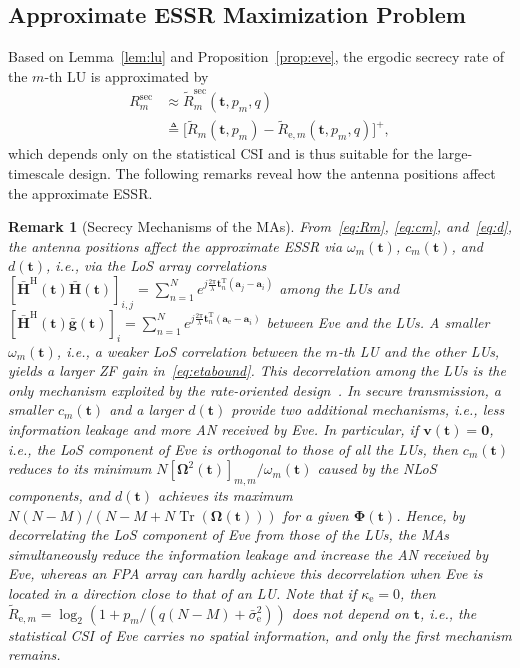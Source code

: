 \documentclass[journal]{IEEEtran}
\newtheorem{remark}{Remark}
\newcommand{\tr}{\operatorname{Tr}}
\newcommand{\bt}{\mathbf{t}}
\newcommand{\gb}{\bar{\mathbf{g}}}
\newcommand{\Hb}{\bar{\mathbf{H}}}
\newcommand{\bv}{\mathbf{v}}
\newcommand{\ba}{\mathbf{a}}
\newcommand{\bOm}{\boldsymbol{\Omega}}
\newcommand{\bPhi}{\boldsymbol{\Phi}}
\newcommand{\sbe}{\bar{\sigma}_{\mathrm{e}}^2}
\begin{document}
\subsection{Approximate ESSR Maximization Problem}\label{sec:discussion}

Based on Lemma~\ref{lem:lu} and Proposition~\ref{prop:eve}, the ergodic secrecy rate of the $m$-th LU is approximated by
\begin{equation}\label{eq:esrapprox}
\begin{aligned}
R_m^{\mathrm{sec}}&\approx\tilde R_m^{\mathrm{sec}}(\bt,p_m,q)\\
&\triangleq\big[\tilde R_m(\bt,p_m)
 -\tilde R_{\mathrm{e},m}(\bt,p_m,q)\big]^+,
\end{aligned}
\end{equation}
which depends only on the statistical CSI and is thus suitable for the large-timescale design. The following remarks reveal how the antenna positions affect the approximate ESSR.

\begin{remark}[Secrecy Mechanisms of the MAs]\label{rem:mech}
From~\eqref{eq:Rm}, \eqref{eq:cm}, and~\eqref{eq:d}, the antenna positions affect the approximate ESSR via $\omega_m(\bt)$, $c_m(\bt)$, and $d(\bt)$, i.e., via the LoS array correlations $[\Hb^{\mathrm{H}}(\bt)\Hb(\bt)]_{i,j}=\sum_{n=1}^{N}e^{j\frac{2\pi}{\lambda}\bt_n^{\mathrm{T}}(\ba_j-\ba_i)}$ among the LUs and $[\Hb^{\mathrm{H}}(\bt)\gb(\bt)]_{i}=\sum_{n=1}^{N}e^{j\frac{2\pi}{\lambda}\bt_n^{\mathrm{T}}(\ba_{\mathrm{e}}-\ba_i)}$ between Eve and the LUs. A smaller $\omega_m(\bt)$, i.e., a weaker LoS correlation between the $m$-th LU and the other LUs, yields a larger ZF gain in~\eqref{eq:etabound}. This decorrelation among the LUs is the only mechanism exploited by the rate-oriented design~\cite{ZhengTCOM2025}. In secure transmission, a smaller $c_m(\bt)$ and a larger $d(\bt)$ provide two additional mechanisms, i.e., less information leakage and more AN received by Eve. In particular, if $\bv(\bt)=\mathbf 0$, i.e., the LoS component of Eve is orthogonal to those of all the LUs, then $c_m(\bt)$ reduces to its minimum $N[\bOm^2(\bt)]_{m,m}/\omega_m(\bt)$ caused by the NLoS components, and $d(\bt)$ achieves its maximum $N(N-M)/(N-M+N\tr(\bOm(\bt)))$ for a given $\bPhi(\bt)$. Hence, by decorrelating the LoS component of Eve from those of the LUs, the MAs simultaneously reduce the information leakage and increase the AN received by Eve, whereas an FPA array can hardly achieve this decorrelation when Eve is located in a direction close to that of an LU. Note that if $\kappa_{\mathrm{e}}=0$, then $\tilde R_{\mathrm{e},m}=\log_2(1+p_m/(q(N-M)+\sbe))$ does not depend on $\bt$, i.e., the statistical CSI of Eve carries no spatial information, and only the first mechanism remains.
\end{remark}
\end{document}
